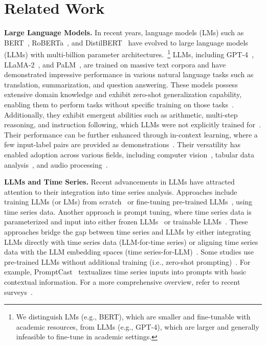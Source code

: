 \section{Related Work}
\label{sec:related}
\noindent\textbf{Large Language Models.}
In recent years, language models (LMs) such as BERT~\cite{devlin2019bert}, RoBERTa~\cite{liu2019roberta}, and DistilBERT~\cite{sanh2019distilbert} have evolved to large language models (LLMs) with multi-billion parameter architectures.~\footnote{We distinguish LMs (e.g., BERT), which are smaller and fine-tunable with academic resources, from LLMs (e.g., GPT-4), which are larger and generally infeasible to fine-tune in academic settings.}
LLMs, including GPT-4~\cite{achiam2023gpt}, LLaMA-2~\cite{touvron2023llama}, and PaLM~\cite{anil2023palm}, are trained on massive text corpora and have demonstrated impressive performance in various natural language tasks such as translation, summarization, and question answering.
These models possess extensive domain knowledge and exhibit zero-shot generalization capability, enabling them to perform tasks without specific training on those tasks~\cite{yang2024harnessing,brown2020language,kojima2022large}. 
Additionally, they exhibit emergent abilities such as arithmetic, multi-step reasoning, and instruction following, which LLMs were not explicitly trained for~\cite{wei2022emergent}. 
Their performance can be further enhanced through in-context learning, where a few input-label pairs are provided as demonstrations~\cite{brown2020language,min2022rethinking,liu2021makes}.
Their versatility has enabled adoption across various fields, including computer vision~\cite{koh2023grounding,guo2023images,pan2023retrieving,tsimpoukelli2021multimodal}, tabular data analysis~\cite{hegselmann2023tabllm,narayan2022can}, and audio processing~\cite{deshmukh2024training,tang2024extending}.

\noindent\textbf{LLMs and Time Series.}
Recent advancements in LLMs have attracted attention to their integration into time series analysis.
Approaches include training LLMs (or LMs) from scratch~\cite{ansari2024chronos,nie2022time,zhang2022crossformer} or fine-tuning pre-trained LLMs~\cite{zhou2024one,chang2023llm4ts}, using time series data.
Another approach is prompt tuning, where time series data is parameterized and input into either frozen LLMs~\cite{jin2023time,sun2023test} or trainable LLMs~\cite{cao2023tempo}.
These approaches bridge the gap between time series and LLMs by either integrating LLMs directly with time series data (LLM-for-time series) or aligning time series data with the LLM embedding spaces (time series-for-LLM)~\cite{sun2023test}.
Some studies use pre-trained LLMs without additional training (i.e., zero-shot prompting)~\cite{gruver2024large,liu2023large,xue2023promptcast}. 
For example, PromptCast~\cite{xue2023promptcast} textualizes time series inputs into prompts with basic contextual information.
For a more comprehensive overview, refer to recent surveys~\cite{jin2023large,jiang2024empowering,zhang2024large}.

